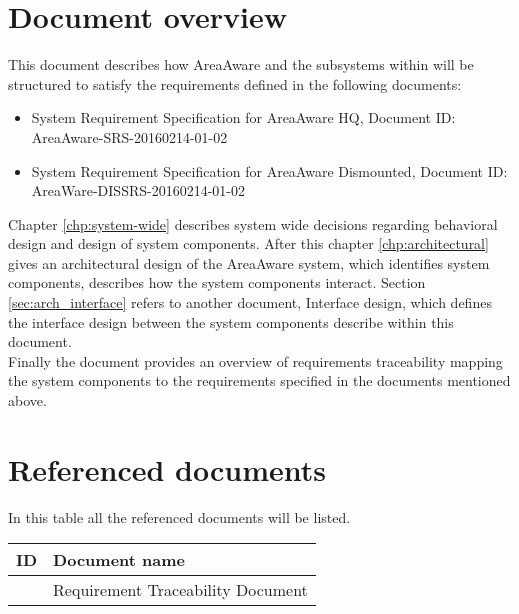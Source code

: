 \section{Document overview}
This document describes how AreaAware and the subsystems within will be structured to satisfy the requirements defined in the following documents:
\begin{itemize}
    \item System Requirement Specification for AreaAware HQ, Document ID: AreaAware-SRS-20160214-01-02
    \item System Requirement Specification for AreaAware Dismounted, Document ID: AreaWare-DISSRS-20160214-01-02
\end{itemize}

Chapter \ref{chp:system-wide} describes system wide decisions regarding behavioral design and design of system components.
After this chapter \ref{chp:architectural} gives an architectural design of the AreaAware system, which identifies system components, describes how the system components interact.
Section \ref{sec:arch_interface} refers to another document, Interface design, which defines the interface design between the system components describe within this document. \\
Finally the document provides an overview of requirements traceability mapping the system components to the requirements specified in the documents mentioned above.

\section{Referenced documents}
In this table all the referenced documents will be listed.

\begin{tabular}{b{6cm} b{7cm}}
	\textbf{ID} & \textbf{Document name} \\
	\hline
	\rtm & Requirement Traceability Document \\
\end{tabular}